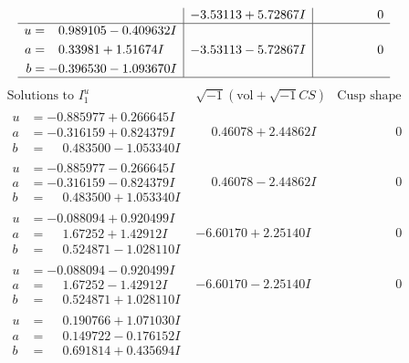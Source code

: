 \documentclass[1p]{elsarticle_modified}
\theoremstyle{definition}
\newcommand{\I}{\sqrt{-1}}
\begin{document}
$$\begin{array}{c|c|c}
 & -3.53113 + 5.72867 I & \phantom{-0.000000 } 0 \\ \hline\begin{aligned}
u &= \phantom{-}0.989105 - 0.409632 I \\
a &= \phantom{-}0.33981 + 1.51674 I \\
b &= -0.396530 - 1.093670 I\end{aligned}
 & -3.53113 - 5.72867 I & \phantom{-0.000000 } 0\\
 \hline 
 \end{array}$$\newpage$$\begin{array}{c|c|c}  
\text{Solutions to }I^u_{1}& \I (\text{vol} + \sqrt{-1}CS) & \text{Cusp shape}\\
 \hline 
\begin{aligned}
u &= -0.885977 + 0.266645 I \\
a &= -0.316159 + 0.824379 I \\
b &= \phantom{-}0.483500 - 1.053340 I\end{aligned}
 & \phantom{-}0.46078 + 2.44862 I & \phantom{-0.000000 } 0 \\ \hline\begin{aligned}
u &= -0.885977 - 0.266645 I \\
a &= -0.316159 - 0.824379 I \\
b &= \phantom{-}0.483500 + 1.053340 I\end{aligned}
 & \phantom{-}0.46078 - 2.44862 I & \phantom{-0.000000 } 0 \\ \hline\begin{aligned}
u &= -0.088094 + 0.920499 I \\
a &= \phantom{-}1.67252 + 1.42912 I \\
b &= \phantom{-}0.524871 - 1.028110 I\end{aligned}
 & -6.60170 + 2.25140 I & \phantom{-0.000000 } 0 \\ \hline\begin{aligned}
u &= -0.088094 - 0.920499 I \\
a &= \phantom{-}1.67252 - 1.42912 I \\
b &= \phantom{-}0.524871 + 1.028110 I\end{aligned}
 & -6.60170 - 2.25140 I & \phantom{-0.000000 } 0 \\ \hline\begin{aligned}
u &= \phantom{-}0.190766 + 1.071030 I \\
a &= \phantom{-}0.149722 - 0.176152 I \\
b &= \phantom{-}0.691814 + 0.435694 I\end{aligned}

\end{array}$$
\end{document}
